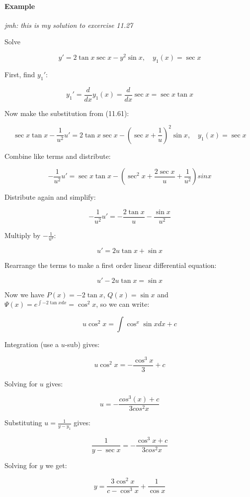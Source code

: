 \documentclass{article}
\begin{document}
\paragraph{Example}

\emph{jmh: this is my solution to excercise 11.27}

Solve

\[ y' = 2\tan{x}\sec{x}-y^2\sin{x}, \quad {y_1}(x) = \sec{x} \]

First, find ${y_1}'$:

\[ {y_1}' = \frac{d}{dx}{y_1}(x) = \frac{d}{dx}\sec{x} = \sec{x}\tan{x} \]

Now make the substitution from (11.61):

\[ \sec{x}\tan{x} - \frac{1}{u^2}u' = 2\tan{x}\sec{x}-(\sec{x} + \frac{1}{u})^2\sin{x}, \quad {y_1}(x) = \sec{x} \]

Combine like terms and distribute:

\[ -\frac{1}{u^2}u' = \sec{x}\tan{x} -(\sec^2{x} + \frac{2\sec{x}}{u} + \frac{1}{u^2})sinx \]

Distribute again and simplify:

\[ -\frac{1}{u^2}u' = -\frac{2\tan{x}}{u} - \frac{\sin{x}}{u^2} \]

Multiply by $-\frac{1}{u^2}$:

\[ u' = 2u\tan{x} + \sin{x} \]

Rearrange the terms to make a first order linear differential equation:

\[ u' - 2u\tan{x} = \sin{x} \]

Now we have $P(x) = -2\tan{x}$, $Q(x) = \sin{x}$ and $\Psi(x) = e^{\int{-2\tan{x}}dx} = \cos^2{x} $, so we can write:

\[ u\cos^2{x} = \int{\cos^{x}\sin{x}dx} + c \]

Integration (use a $u$-sub) gives:

\[ u\cos^2{x} = -\frac{\cos^3{x}}{3}+c \]

Solving for $u$ gives:

\[ u = -\frac{cos^3(x) + c}{3cos^2{x}} \]

Substituting $u = \frac{1}{y-y_1}$ gives:

\[ \frac{1}{y-\sec{x}} = -\frac{\cos^3{x} + c}{3cos^2{x}} \]

Solving for $y$ we get:

\[ y = \frac{3\cos^2{x}}{c - \cos^3{x}} + \frac{1}{\cos{x}} \]
\end{document}
